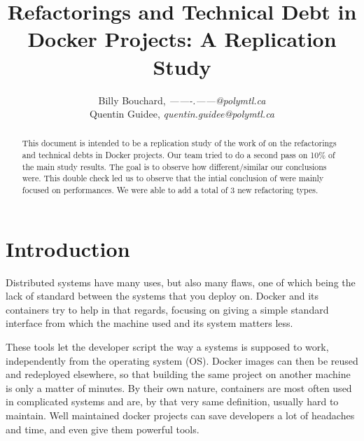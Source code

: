 \documentclass[lettersize,journal]{IEEEtran}
\begin{document}
\title{Refactorings and Technical Debt in Docker Projects: A Replication Study}

\author{Billy Bouchard, \emph{-------.------@polymtl.ca}\\
        Quentin Guidee, \emph{quentin.guidee@polymtl.ca}}



\maketitle

\begin{abstract}
This document is intended to be a replication study of the work of \cite{1} on the refactorings and technical debts in Docker projects.
Our team tried to do a second pass on 10\% of the main study results. The goal is to observe how different/similar our conclusions were.
This double check led us to observe that the intial conclusion of \cite{1} were mainly focused on performances.
We were able to add a total of 3 new refactoring types.
\end{abstract}


\section{Introduction}
Distributed systems have many uses, but also many flaws, one of which being the lack of standard between the systems that you deploy on.
Docker and its containers try to help in that regards, focusing on giving a simple standard interface from which the machine used and its system matters less.

These tools let the developer script the way a systems is supposed to work, independently from the operating system (OS).
Docker images can then be reused and redeployed elsewhere, so that building the same project on another machine is only a matter of minutes.
By their own nature, containers are most often used in complicated systems and are, by that very same definition, usually hard to maintain.
Well maintained docker projects can save developers a lot of headaches and time, and even give them powerful tools.
\end{document}
